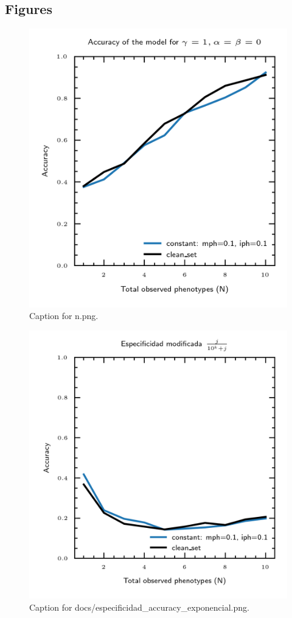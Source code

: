 \documentclass{article}
\begin{document}
\subsection{Figures}

\begin{figure}[h] \centering \includegraphics{n.png} \caption{Caption for n.png.} \end{figure}
\begin{figure}[h] \centering \includegraphics{docs/especificidad_accuracy_exponencial.png} \caption{Caption for docs/especificidad_accuracy_exponencial.png.} \end{figure}
\end{document}

